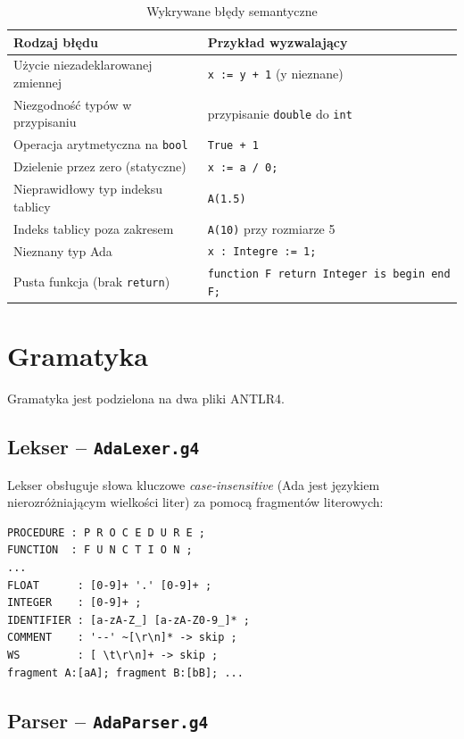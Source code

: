 \documentclass[12pt,a4paper]{article}
\begin{document}
\begin{table}[h!]
\centering
\begin{tabular}{ll}
\toprule
\textbf{Rodzaj błędu} & \textbf{Przykład wyzwalający} \\
\midrule
Użycie niezadeklarowanej zmiennej & \texttt{x := y + 1} (y nieznane) \\
Niezgodność typów w przypisaniu & przypisanie \texttt{double} do \texttt{int} \\
Operacja arytmetyczna na \texttt{bool} & \texttt{True + 1} \\
Dzielenie przez zero (statyczne) & \texttt{x := a / 0;} \\
Nieprawidłowy typ indeksu tablicy & \texttt{A(1.5)} \\
Indeks tablicy poza zakresem & \texttt{A(10)} przy rozmiarze 5 \\
Nieznany typ Ada & \texttt{x : Integre := 1;} \\
Pusta funkcja (brak \texttt{return}) & \texttt{function F return Integer is begin end F;} \\
\bottomrule
\end{tabular}
\caption{Wykrywane błędy semantyczne}
\end{table}

\section{Gramatyka}

Gramatyka jest podzielona na dwa pliki ANTLR4.

\subsection{Lekser -- \texttt{AdaLexer.g4}}

Lekser obsługuje słowa kluczowe \emph{case-insensitive} (Ada jest językiem
nierozróżniającym wielkości liter) za pomocą fragmentów literowych:

\begin{lstlisting}[style=bnf, caption={Fragment AdaLexer.g4}]
PROCEDURE : P R O C E D U R E ;
FUNCTION  : F U N C T I O N ;
...
FLOAT      : [0-9]+ '.' [0-9]+ ;
INTEGER    : [0-9]+ ;
IDENTIFIER : [a-zA-Z_] [a-zA-Z0-9_]* ;
COMMENT    : '--' ~[\r\n]* -> skip ;
WS         : [ \t\r\n]+ -> skip ;
fragment A:[aA]; fragment B:[bB]; ...
\end{lstlisting}

\subsection{Parser -- \texttt{AdaParser.g4}}
\end{document}
